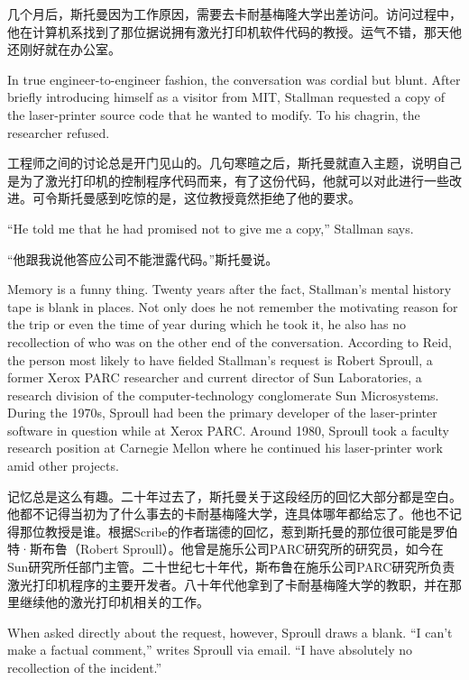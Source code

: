 \ifdefined\chs
几个月后，斯托曼因为工作原因，需要去卡耐基梅隆大学出差访问。访问过程中，他在计算机系找到了那位据说拥有激光打印机软件代码的教授。运气不错，那天他还刚好就在办公室。
\fi

\ifdefined\eng
In true engineer-to-engineer fashion, the conversation was cordial but blunt. After briefly introducing himself as a visitor from MIT, Stallman requested a copy of the laser-printer source code that he wanted to modify. To his chagrin, the researcher refused.
\fi

\ifdefined\chs
工程师之间的讨论总是开门见山的。几句寒暄之后，斯托曼就直入主题，说明自己是为了激光打印机的控制程序代码而来，有了这份代码，他就可以对此进行一些改进。可令斯托曼感到吃惊的是，这位教授竟然拒绝了他的要求。
\fi

\ifdefined\eng
``He told me that he had promised not to give me a copy,'' Stallman says.
\fi

\ifdefined\chs
“他跟我说他答应公司不能泄露代码。”斯托曼说。
\fi

\ifdefined\eng
Memory is a funny thing. Twenty years after the fact, Stallman's mental history tape is blank in places. Not only does he not remember the motivating reason for the trip or even the time of year during which he took it, he also has no recollection of who was on the other end of the conversation. According to Reid, the person most likely to have fielded Stallman's request is Robert Sproull, a former Xerox PARC researcher and current director of Sun Laboratories, a research division of the computer-technology conglomerate Sun Microsystems. During the 1970s, Sproull had been the primary developer of the laser-printer software in question while at Xerox PARC. Around 1980, Sproull took a faculty research position at Carnegie Mellon where he continued his laser-printer work amid other projects.
\fi

\ifdefined\chs
记忆总是这么有趣。二十年过去了，斯托曼关于这段经历的回忆大部分都是空白。他都不记得当初为了什么事去的卡耐基梅隆大学，连具体哪年都给忘了。他也不记得那位教授是谁。根据Scribe的作者瑞德的回忆，惹到斯托曼的那位很可能是罗伯特·斯布鲁（Robert Sproull）。他曾是施乐公司PARC研究所的研究员，如今在Sun研究所任部门主管。二十世纪七十年代，斯布鲁在施乐公司PARC研究所负责激光打印机程序的主要开发者。八十年代他拿到了卡耐基梅隆大学的教职，并在那里继续他的激光打印机相关的工作。
\fi

\ifdefined\eng
When asked directly about the request, however, Sproull draws a blank. ``I can't make a factual comment,'' writes Sproull via email. ``I have absolutely no recollection of the incident.''
\fi

